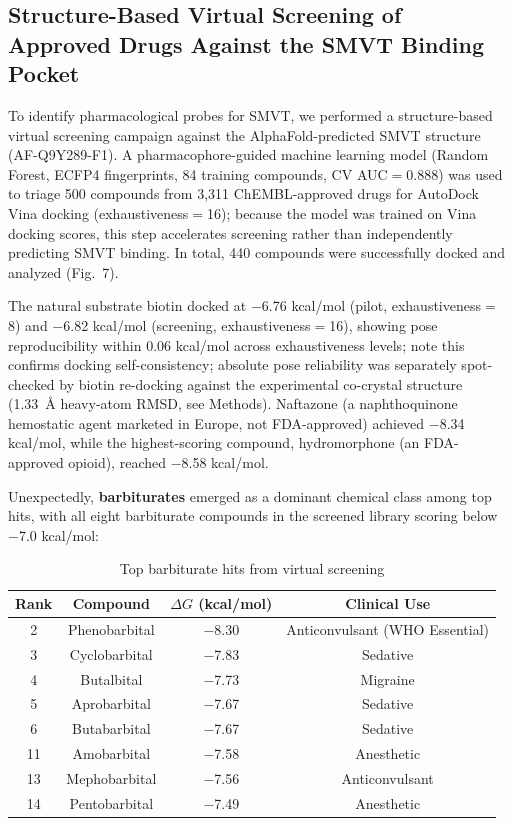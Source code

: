 \documentclass[pdflatex,sn-nature]{sn-jnl}
\begin{document}
\subsection*{Structure-Based Virtual Screening of Approved Drugs Against the SMVT Binding Pocket}

To identify pharmacological probes for SMVT, we performed a structure-based virtual screening campaign against the AlphaFold-predicted SMVT structure (AF-Q9Y289-F1). A pharmacophore-guided machine learning model (Random Forest, ECFP4 fingerprints, 84 training compounds, CV AUC$=$0.888) was used to triage 500 compounds from 3,311 ChEMBL-approved drugs for AutoDock Vina docking (exhaustiveness$=$16); because the model was trained on Vina docking scores, this step accelerates screening rather than independently predicting SMVT binding. In total, 440 compounds were successfully docked and analyzed (Fig.~7).

The natural substrate biotin docked at $-$6.76 kcal/mol (pilot, exhaustiveness$=$8) and $-$6.82 kcal/mol (screening, exhaustiveness$=$16), showing pose reproducibility within 0.06 kcal/mol across exhaustiveness levels; note this confirms docking self-consistency; absolute pose reliability was separately spot-checked by biotin re-docking against the experimental co-crystal structure (1.33~\AA{} heavy-atom RMSD, see Methods). Naftazone (a naphthoquinone hemostatic agent marketed in Europe, not FDA-approved) achieved $-$8.34 kcal/mol, while the highest-scoring compound, hydromorphone (an FDA-approved opioid), reached $-$8.58 kcal/mol.

Unexpectedly, \textbf{barbiturates} emerged as a dominant chemical class among top hits, with all eight barbiturate compounds in the screened library scoring below $-$7.0 kcal/mol:

\begin{table}[t]
\centering
\caption{Top barbiturate hits from virtual screening}
\label{tab:barbiturates}
\begin{tabular}{cccc}
\toprule
Rank & Compound & $\Delta G$ (kcal/mol) & Clinical Use \\
\midrule
 2 & Phenobarbital & $-$8.30 & Anticonvulsant (WHO Essential) \\
 3 & Cyclobarbital & $-$7.83 & Sedative \\
 4 & Butalbital    & $-$7.73 & Migraine \\
 5 & Aprobarbital  & $-$7.67 & Sedative \\
 6 & Butabarbital  & $-$7.67 & Sedative \\
11 & Amobarbital   & $-$7.58 & Anesthetic \\
13 & Mephobarbital & $-$7.56 & Anticonvulsant \\
14 & Pentobarbital & $-$7.49 & Anesthetic \\
\bottomrule
\end{tabular}
\end{table}
\end{document}
